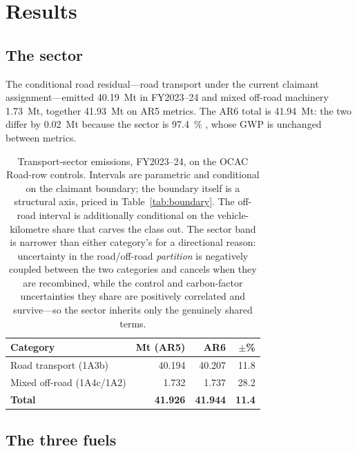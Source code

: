 \section{Results}
\label{sec:results}

\subsection{The sector}

The conditional road residual---road transport under the current claimant
assignment---emitted \SI{40.19}{\mega\tonne} \COe{} in FY2023--24 and mixed off-road machinery
\SI{1.73}{\mega\tonne}, together \SI{41.93}{\mega\tonne} on AR5 metrics. The AR6 total is
\SI{41.94}{\mega\tonne}: the two differ by \SI{0.02}{\mega\tonne} because the sector is
\SI{97.4}{\percent} \COtwo{}, whose GWP is unchanged between metrics.

\begin{table}[htbp]
\centering
\footnotesize
\begin{tabular}{@{}lrrr@{}}
\toprule
\textbf{Category} & \textbf{Mt \COe{} (AR5)} & \textbf{AR6} & \textbf{$\pm$\%} \\
\midrule
Road transport (1A3b)     & 40.194 & 40.207 & 11.8 \\
Mixed off-road (1A4c/1A2) &  1.732 &  1.737 & 28.2 \\
\midrule
\textbf{Total}            & \textbf{41.926} & \textbf{41.944} & \textbf{11.4} \\
\bottomrule
\end{tabular}
\caption{Transport-sector emissions, FY2023--24, on the OCAC Road-row controls. Intervals are
parametric and conditional on the claimant boundary; the boundary itself is a structural
axis, priced in Table~\ref{tab:boundary}. The off-road interval is additionally
conditional on the vehicle-kilometre share that carves the class out. The sector band is
narrower than either category's for a directional reason: uncertainty in the road/off-road
\emph{partition} is negatively coupled between the two categories and cancels when they
are recombined, while the control and carbon-factor uncertainties they share are
positively correlated and survive---so the sector inherits only the genuinely shared
terms.}
\label{tab:results}
\end{table}

\subsection{The three fuels}

